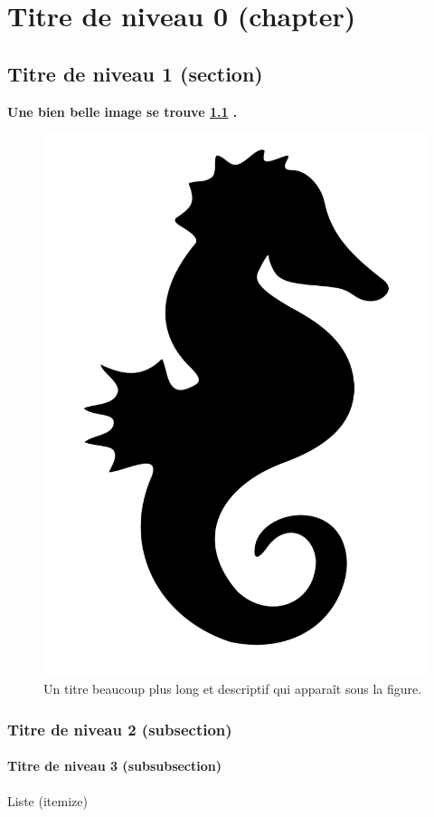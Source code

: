 \chapter{Titre de niveau 0 (chapter)}
\thispagestyle{plainStarred}


\blindtext


\section{Titre de niveau 1 (section)}
\blindtext

\textbf{Une bien belle image se trouve \cref{fig47} .}

\begin{figure}
\begin{center}
	\includegraphics[width=.5\textwidth]{figures/intro/figure_47.png}
	\caption[Titre court table des matières]{Un titre beaucoup plus long et descriptif qui apparaît sous la figure.}
	\label{fig47}
\end{center}
\end{figure}

	\subsection{Titre de niveau 2 (subsection)}
\blindtext
\cite{Arduin2017}

		\subsubsection{Titre de niveau 3 (subsubsection)}
\blindtext

\medskip
Liste (itemize)
\blinditemize

